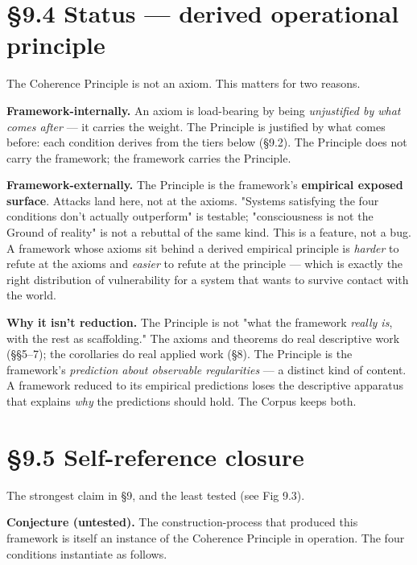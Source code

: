 \documentclass[11pt, openany]{book}
\newcommand{\sectionbreak}{\clearpage}
\begin{document}
\sectionbreak

\section{§9.4 Status --- derived operational principle}

The Coherence Principle is not an axiom. This matters for two reasons.

\textbf{Framework-internally.} An axiom is load-bearing by being \textit{unjustified by what comes after} --- it carries the weight. The Principle is justified by what comes before: each condition derives from the tiers below (§9.2). The Principle does not carry the framework; the framework carries the Principle.

\textbf{Framework-externally.} The Principle is the framework's \textbf{empirical exposed surface}. Attacks land here, not at the axioms. "Systems satisfying the four conditions don't actually outperform" is testable; "consciousness is not the Ground of reality" is not a rebuttal of the same kind. This is a feature, not a bug. A framework whose axioms sit behind a derived empirical principle is \textit{harder} to refute at the axioms and \textit{easier} to refute at the principle --- which is exactly the right distribution of vulnerability for a system that wants to survive contact with the world.

\textbf{Why it isn't reduction.} The Principle is not "what the framework \textit{really is}, with the rest as scaffolding." The axioms and theorems do real descriptive work (§§5–7); the corollaries do real applied work (§8). The Principle is the framework's \textit{prediction about observable regularities} --- a distinct kind of content. A framework reduced to its empirical predictions loses the descriptive apparatus that explains \textit{why} the predictions should hold. The Corpus keeps both.

\sectionbreak

\section{§9.5 Self-reference closure}

The strongest claim in §9, and the least tested (see Fig 9.3).

\textbf{Conjecture (untested).} The construction-process that produced this framework is itself an instance of the Coherence Principle in operation. The four conditions instantiate as follows.
\end{document}
